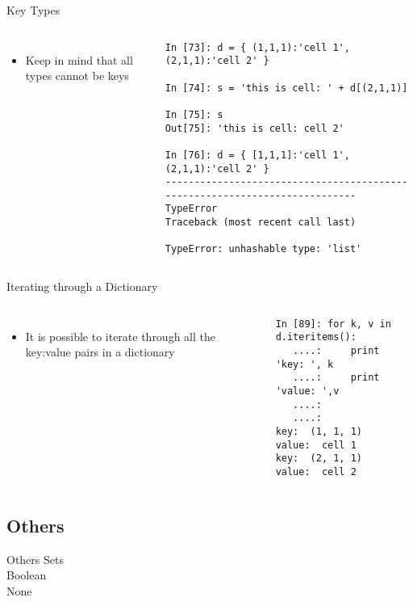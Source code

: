 \documentclass{beamer}
\begin{document}
\begin{frame}[fragile]{Key Types}
\begin{columns}[c]
\column{2.5in}
\begin{itemize}
\item{Keep in mind that all types cannot be keys}
\end{itemize}

\column{2.5in}
\begin{lstlisting}
In [73]: d = { (1,1,1):'cell 1', (2,1,1):'cell 2' }

In [74]: s = 'this is cell: ' + d[(2,1,1)]

In [75]: s
Out[75]: 'this is cell: cell 2'

In [76]: d = { [1,1,1]:'cell 1', (2,1,1):'cell 2' }
---------------------------------------------------------------------------
TypeError                                 Traceback (most recent call last)

TypeError: unhashable type: 'list'

\end{lstlisting}
\end{columns}
\end{frame}


\begin{frame}[fragile]{Iterating through a Dictionary}
\begin{columns}[c]
\column{2.5in}
\begin{itemize}
\item{It is possible to iterate through all the key:value pairs in a dictionary}
\end{itemize}

\column{2.5in}
\begin{lstlisting}
In [89]: for k, v in d.iteritems():
   ....:     print 'key: ', k
   ....:     print 'value: ',v
   ....:
   ....:
key:  (1, 1, 1)
value:  cell 1
key:  (2, 1, 1)
value:  cell 2
\end{lstlisting}
\end{columns}
\end{frame}



\subsection{Others}
\begin{frame}[fragile]{Others}
Sets\\
Boolean\\
None
\end{frame}
\end{document}
